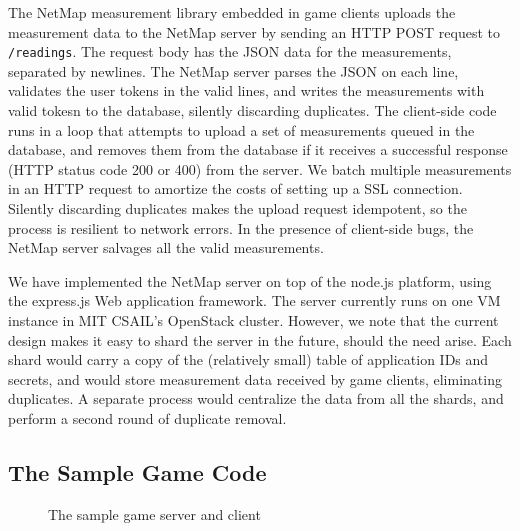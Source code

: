 The NetMap measurement library embedded in game clients uploads the measurement
data to the NetMap server by sending an HTTP POST request to
\texttt{/readings}. The request body has the JSON data for the measurements,
separated by newlines. The NetMap server parses the JSON on each line,
validates the user tokens in the valid lines, and writes the measurements with
valid tokesn to the database, silently discarding duplicates. The client-side
code runs in a loop that attempts to upload a set of measurements queued in the
database, and removes them from the database if it receives a successful
response (HTTP status code 200 or 400) from the server. We batch multiple
measurements in an HTTP request to amortize the costs of setting up a SSL
connection. Silently discarding duplicates makes the upload request idempotent,
so the process is resilient to network errors. In the presence of client-side
bugs, the NetMap server salvages all the valid measurements.

We have implemented the NetMap server on top of the node.js platform, using the
express.js Web application framework. The server currently runs on one VM
instance in MIT CSAIL's OpenStack cluster. However, we note that the current
design makes it easy to shard the server in the future, should the need arise.
Each shard would carry a copy of the (relatively small) table of application
IDs and secrets, and would store measurement data received by game clients,
eliminating duplicates. A separate process would centralize the data from all
the shards, and perform a second round of duplicate removal.

\subsection{The Sample Game Code}

\begin{figure}[hbtp]
  \caption{
    The sample game server and client
  }
  \label{fig:sample}
\end{figure}

